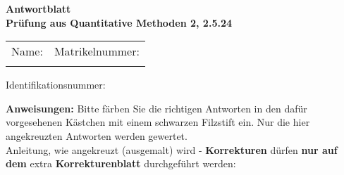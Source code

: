 \documentclass[12pt]{article}
\begin{document}
\begin{center}
\textbf{\Huge Antwortblatt} \\
\vspace{0.3cm}
\textbf{Prüfung aus Quantitative Methoden 2, 2.5.24} \\
\vspace{0.3cm}
\end{center}
\vspace{0.5cm}

\begin{tabular}{@{}p{}p{}@{}}
  Name: & Matrikelnummer: \\
  \vspace{5mm} & \vspace{5mm} \\
\end{tabular}

\vspace{10mm}

\noindent Identifikationsnummer:

\bigskip

\noindent
{}
\vspace{5mm}

\noindent \textbf{Anweisungen:} Bitte färben Sie die richtigen Antworten in den dafür vorgesehenen Kästchen mit einem schwarzen Filzstift ein. Nur die hier angekreuzten Antworten werden gewertet.\\
Anleitung, wie angekreuzt (ausgemalt) wird - \textbf{Korrekturen} dürfen \textbf{nur auf dem} extra \textbf{Korrekturenblatt} durchgeführt werden:
\end{document}
